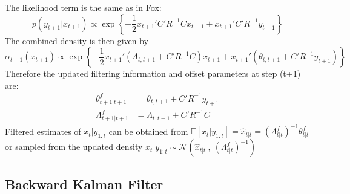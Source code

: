 \documentclass[12pt]{article}
\newcommand{\E}{\mathbb{E}}
\begin{document}
The likelihood term is the same as in Fox:
\[p(y_{t+1}|x_{t+1})\propto\exp\left\{-\frac{1}{2} x_{t+1}'C'R^{-1}Cx_{t+1} + x_{t+1}'C'R^{-1}y_{t+1}\right\}\]
The combined density is then given by
\[\alpha_{t+1}(x_{t+1})\propto\exp\left\{-\frac{1}{2}x_{t+1}'\left(\Lambda_{t,t+1}+C'R^{-1}C\right)x_{t+1} + x_{t+1}'\left(\theta_{t,t+1}+C'R^{-1}y_{t+1}\right)\right\}\]
Therefore the updated filtering information and offset parameters at step (t+1) are:
\begin{align*}
\theta^f_{t+1|t+1} &= \theta_{t,t+1} + C'R^{-1}y_{t+1}\\
\Lambda^f_{t+1|t+1} &= \Lambda_{t,t+1} + C'R^{-1}C %
\end{align*}
Filtered estimates of $x_{t}|y_{1:t}$ can be obtained from $\E[x_{t}|y_{1:t}] = \hat{x}_{t|t} = \left(\Lambda^f_{t|t}\right)^{-1}\theta^f_{t|t}$ or sampled from the updated density $x_{t}|y_{1:t}\sim\mathcal{N}\left(\hat{x}_{t|t}~,~\left(\Lambda^f_{t|t}\right)^{-1}\right)$

\subsection{Backward Kalman Filter}
\end{document}
